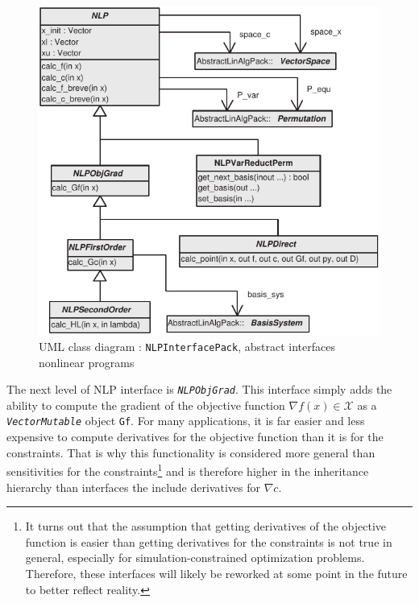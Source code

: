 \documentclass[pdf,12pt,report]{SANDreport}
\begin{document}
{\bsinglespace
\begin{figure}[t]
\begin{center}
\includegraphics*[bb= 0.0in 0.0in 4.2in 4.05in,scale=0.80
]{NLPInterfacePack}
\end{center}
\caption{
\label{moocho:fig:NLPInterfacePack}
UML class diagram : {}\texttt{NLPInterfacePack}, abstract interfaces nonlinear programs
}
\end{figure}
\esinglespace}

The next level of NLP interface is {}\texttt{\textit{NLPObjGrad}}.  This
interface simply adds the ability to compute the gradient of the objective
function $\nabla f(x) \in \mathcal{X}$ as a {}\texttt{\textit{VectorMutable}}
object {}\texttt{Gf}.  For many applications, it is far easier and less
expensive to compute derivatives for the objective function than it is for the
constraints.  That is why this functionality is considered more general than
sensitivities for the constraints\footnote{It turns out that the assumption
that getting derivatives of the objective function is easier than getting
derivatives for the constraints is not true in general, especially for
simulation-constrained optimization problems.  Therefore, these interfaces
will likely be reworked at some point in the future to better reflect
reality.}  and is therefore higher in the inheritance hierarchy than
interfaces the include derivatives for $\nabla c$.
\end{document}
